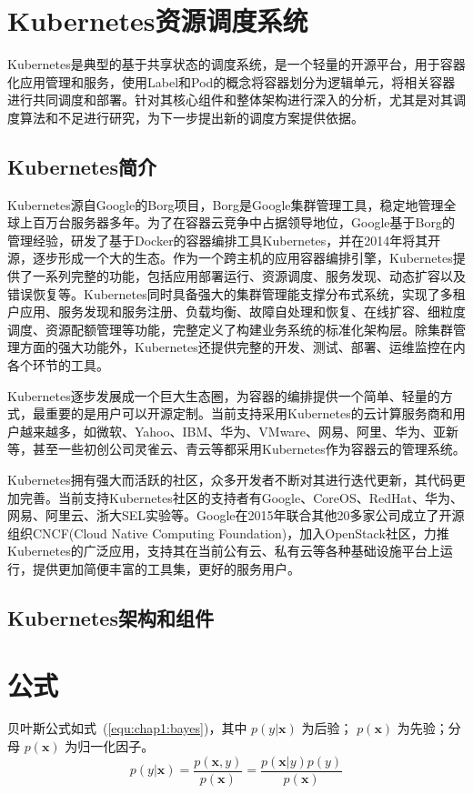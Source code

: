 \section{Kubernetes资源调度系统}
\label{sec:bib}
Kubernetes是典型的基于共享状态的调度系统，是一个轻量的开源平台，用于容器化应用管理和服务，使用Label和Pod的概念将容器划分为逻辑单元，将相关容器进行共同调度和部署。针对其核心组件和整体架构进行深入的分析，尤其是对其调度算法和不足进行研究，为下一步提出新的调度方案提供依据。
\subsection{Kubernetes简介}
Kubernetes源自Google的Borg项目，Borg是Google集群管理工具，稳定地管理全球上百万台服务器多年。为了在容器云竞争中占据领导地位，Google基于Borg的管理经验，研发了基于Docker的容器编排工具Kubernetes，并在2014年将其开源，逐步形成一个大的生态。作为一个跨主机的应用容器编排引擎，Kubernetes提供了一系列完整的功能，包括应用部署运行、资源调度、服务发现、动态扩容以及错误恢复等。Kubernetes同时具备强大的集群管理能支撑分布式系统，实现了多租户应用、服务发现和服务注册、负载均衡、故障自处理和恢复、在线扩容、细粒度调度、资源配额管理等功能，完整定义了构建业务系统的标准化架构层。除集群管理方面的强大功能外，Kubernetes还提供完整的开发、测试、部署、运维监控在内各个环节的工具。

Kubernetes逐步发展成一个巨大生态圈，为容器的编排提供一个简单、轻量的方式，最重要的是用户可以开源定制。当前支持采用Kubernetes的云计算服务商和用户越来越多，如微软、Yahoo、IBM、华为、VMware、网易、阿里、华为、亚新等，甚至一些初创公司灵雀云、青云等都采用Kubernetes作为容器云的管理系统。

Kubernetes拥有强大而活跃的社区，众多开发者不断对其进行迭代更新，其代码更加完善。当前支持Kubernetes社区的支持者有Google、CoreOS、RedHat、华为、网易、阿里云、浙大SEL实验等。Google在2015年联合其他20多家公司成立了开源组织CNCF(Cloud Native Computing Foundation)，加入OpenStack社区，力推Kubernetes的广泛应用，支持其在当前公有云、私有云等各种基础设施平台上运行，提供更加简便丰富的工具集，更好的服务用户。

\subsection{Kubernetes架构和组件}


\section{公式}
\label{sec:equation}
贝叶斯公式如式~(\ref{equ:chap1:bayes})，其中 $p(y|\mathbf{x})$ 为后验；
$p(\mathbf{x})$ 为先验；分母 $p(\mathbf{x})$ 为归一化因子。
\begin{equation}
\label{equ:chap1:bayes}
p(y|\mathbf{x}) = \frac{p(\mathbf{x},y)}{p(\mathbf{x})}=
\frac{p(\mathbf{x}|y)p(y)}{p(\mathbf{x})} 
\end{equation}

